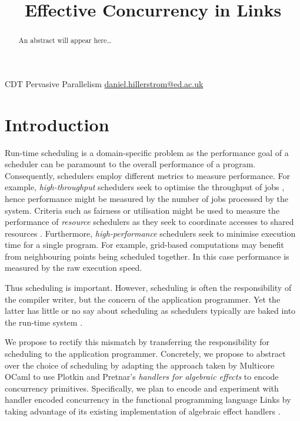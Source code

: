 \documentclass[preprint,10pt,numbers]{sigplanconf}
\begin{document}
\title{Effective Concurrency in Links}

           {CDT Pervasive Parallelism}
           {\href{mailto:daniel.hillerstrom@ed.ac.uk}{daniel.hillerstrom@ed.ac.uk}}
  \maketitle
  \begin{abstract}
    An abstract will appear here\dots
  \end{abstract}
  \raggedbottom
  \section{Introduction}
Run-time scheduling is a domain-specific problem as the performance goal of a scheduler can be paramount to the overall performance of a program. Consequently, schedulers employ different metrics to measure performance. For example, \emph{high-throughput} schedulers seek to optimise the throughput of jobs \cite{Berman2003}, hence performance might be measured by the number of jobs processed by the system. Criteria such as fairness or utilisation might be used to measure the performance of \emph{resource} schedulers as they seek to coordinate accesses to shared resources \cite{Berman2003}. Furthermore, \emph{high-performance} schedulers seek to minimise execution time for a single program. For example, grid-based computations may benefit from neighbouring points being scheduled together. In this case performance is measured by the raw execution speed.

Thus scheduling is important. However, scheduling is often the responsibility of the compiler writer, but the concern of the application programmer. Yet the latter has little or no say about scheduling as schedulers typically are baked into the run-time system \cite{Dolan2015}. 

We propose to rectify this mismatch by transferring the responsibility for scheduling to the application programmer. Concretely, we propose to abstract over the choice of scheduling by adapting the approach taken by Multicore OCaml \cite{Dolan2015} to use Plotkin and Pretnar's \emph{handlers for algebraic effects} \cite{Plotkin2013} to encode concurrency primitives. Specifically, we plan to encode and experiment with handler encoded concurrency in the functional programming language Links \cite{Cooper2006} by taking advantage of its existing implementation of algebraic effect handlers \cite{Hillerstrom2015}.
\end{document}
